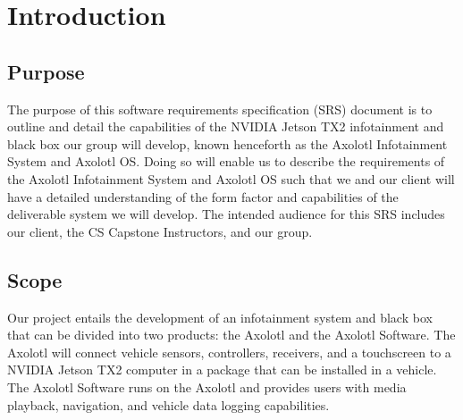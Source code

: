 \documentclass[onecolumn, draftclsnofoot,10pt, compsoc]{IEEEtran}
\begin{document}
\newpage
{}
\tableofcontents
\clearpage

\section{Introduction}
\subsection{Purpose}
The purpose of this software requirements specification (SRS) document is to outline and detail the capabilities of the NVIDIA Jetson TX2 infotainment and black box our group will develop, known henceforth as the Axolotl Infotainment System and Axolotl OS. Doing so will enable us to describe the requirements of the Axolotl Infotainment System and Axolotl OS such that we and our client will have a detailed understanding of the form factor and capabilities of the deliverable system we will develop. The intended audience for this SRS includes our client, the CS Capstone Instructors, and our group.\par

\subsection{Scope}
Our project entails the development of an infotainment system and black box that can be divided into two products: the Axolotl and the Axolotl Software. The Axolotl will connect vehicle sensors, controllers, receivers, and a touchscreen to a NVIDIA Jetson TX2 computer in a package that can be installed in a vehicle. The Axolotl Software runs on the Axolotl and provides users with media playback, navigation, and vehicle data logging capabilities.\par
\end{document}
